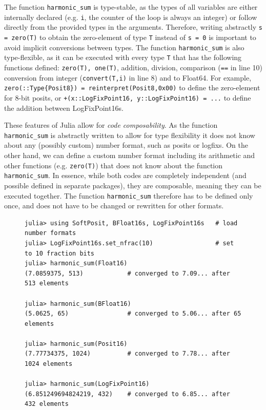 The function \texttt{harmonic\_sum} is type-stable, as the types of all variables are either internally declared (e.g.
\texttt{i}, the counter of the loop is always an integer) or follow directly from the provided types in the arguments.
Therefore, writing abstractly \texttt{s = zero(T)} to obtain the zero-element of type \texttt{T} instead of \texttt{s = 0}
is important to avoid implicit conversions between types. The function \texttt{harmonic\_sum} is also type-flexible,
as it can be executed with every type \texttt{T} that has the following functions defined: \texttt{zero(T), one(T)}, addition,
division, comparison (\texttt{==} in line 10) conversion from integer (\texttt{convert(T,i)} in line 8) and to Float64.
For example, \texttt{zero(::Type\{Posit8\}) = reinterpret(Posit8,0x00)} to define the zero-element for 8-bit posits, or
\texttt{+(x::LogFixPoint16, y::LogFixPoint16) = ...} to define the addition between LogFixPoint16s.

These features of Julia allow for \emph{code composability}. As the function \texttt{harmonic\_sum} is abstractly written
to allow for type flexibility it does not know about any (possibly custom) number format, such as posits or logfixs.
On the other hand, we can define a custom number format including its arithmetic and other functions
(e.g. \texttt{zero(T)}) that does not know about the function \texttt{harmonic\_sum}. In essence, while both codes
are completely independent (and possible defined in separate packages), they are composable, meaning they can
be executed together. The function \texttt{harmonic\_sum} therefore has to be defined only once, and does not have
to be  changed or rewritten for other formats.

\begin{figure}[tbhp]
\begin{lstlisting}[language=JuliaLocal, label=lst:harmonic_sum2, caption={\textbf{Executing \texttt{harmonic\_sum} with different
number formats in the Julia shell.} The number format is passed on as an argument, causing the function \texttt{harmonic\_sum}
to be compiled and executed with that format. Depending on the precision of the number format, the harmonic sum converges
after 65 (BFloat16) to 1024 elements (Posit16).}]
julia> using SoftPosit, BFloat16s, LogFixPoint16s   # load number formats
julia> LogFixPoint16s.set_nfrac(10)                 # set to 10 fraction bits
julia> harmonic_sum(Float16)
(7.0859375, 513)            # converged to 7.09... after 513 elements

julia> harmonic_sum(BFloat16)
(5.0625, 65)                # converged to 5.06... after 65 elements

julia> harmonic_sum(Posit16)
(7.77734375, 1024)          # converged to 7.78... after 1024 elements

julia> harmonic_sum(LogFixPoint16)
(6.851249694824219, 432)    # converged to 6.85... after 432 elements
\end{lstlisting}
\end{figure}

